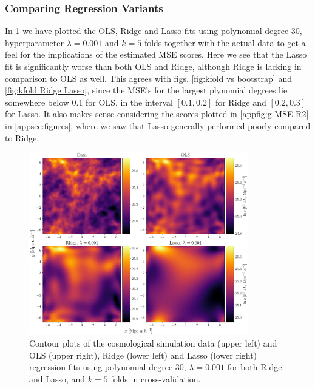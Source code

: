 \documentclass[aps,pra,english,notitlepage,reprint,nofootinbib]{revtex4-1}  %
\begin{document}
\subsubsection{Comparing Regression Variants}
In \cref{fig:density OLS Ridge Lasso} we have plotted the OLS, Ridge and Lasso fits using polynomial degree 30, hyperparameter  $\lambda=0.001$ and $k=5$ folds together with the actual data to get a feel for the implications of the estimated MSE scores. Here we see that the Lasso fit is significantly worse than both OLS and Ridge, although Ridge is lacking in comparison to OLS as well. This agrees with figs. \ref{fig:kfold vs bootstrap} and \ref{fig:kfold Ridge Lasso}, since the MSE's for the largest plynomial degrees lie somewhere below 0.1 for OLS, in the interval $[0.1,0.2]$ for Ridge and $[0.2,0.3]$ for Lasso. It also makes sense considering the scores plotted in \cref{appfig:g MSE R2} in \cref{appsec:figures}, where we saw that Lasso generally performed poorly compared to Ridge.

\begin{figure}
  \vspace*{-5pt}
  \centering %
  \includegraphics[width=0.85\textwidth]{../figs/density_OLS_Ridge_Lasso.pdf}
  \caption{Contour plots of the cosmological simulation data (upper left) and OLS (upper right), Ridge (lower left) and Lasso (lower right) regression fits using polynomial degree 30, $\lambda=0.001$ for both Ridge and Lasso, and $k=5$ folds in cross-validation.}\label{fig:density OLS Ridge Lasso}
  \vspace*{-5pt}
\end{figure}
\end{document}
